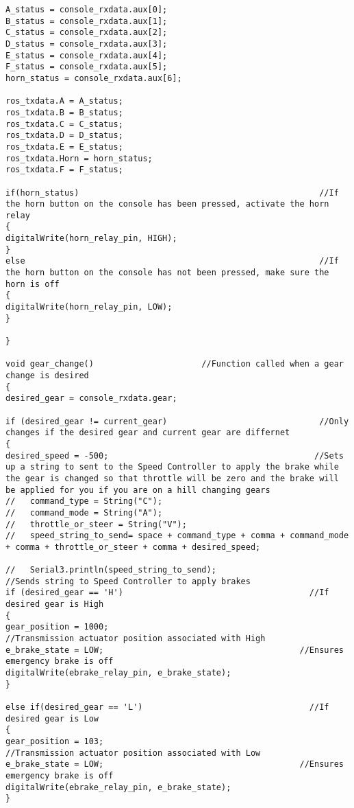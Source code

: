 \begin{lstlisting}[breaklines=true,basicstyle=\tiny]
A_status = console_rxdata.aux[0];
B_status = console_rxdata.aux[1];
C_status = console_rxdata.aux[2];
D_status = console_rxdata.aux[3];
E_status = console_rxdata.aux[4];
F_status = console_rxdata.aux[5];
horn_status = console_rxdata.aux[6];

ros_txdata.A = A_status;
ros_txdata.B = B_status;
ros_txdata.C = C_status;
ros_txdata.D = D_status;
ros_txdata.E = E_status;
ros_txdata.Horn = horn_status;
ros_txdata.F = F_status;

if(horn_status)                                                 //If the horn button on the console has been pressed, activate the horn relay
{
digitalWrite(horn_relay_pin, HIGH);                           
}
else                                                            //If the horn button on the console has not been pressed, make sure the horn is off
{
digitalWrite(horn_relay_pin, LOW);
}

}

void gear_change()                      //Function called when a gear change is desired
{
desired_gear = console_rxdata.gear;

if (desired_gear != current_gear)                               //Only changes if the desired gear and current gear are differnet
{
desired_speed = -500;                                          //Sets up a string to sent to the Speed Controller to apply the brake while the gear is changed so that throttle will be zero and the brake will be applied for you if you are on a hill changing gears
//   command_type = String("C");
//   command_mode = String("A");
//   throttle_or_steer = String("V");
//   speed_string_to_send= space + command_type + comma + command_mode + comma + throttle_or_steer + comma + desired_speed;

//   Serial3.println(speed_string_to_send);                         //Sends string to Speed Controller to apply brakes
if (desired_gear == 'H')                                      //If desired gear is High
{
gear_position = 1000;                                       //Transmission actuator position associated with High
e_brake_state = LOW;                                        //Ensures emergency brake is off
digitalWrite(ebrake_relay_pin, e_brake_state);              
}

else if(desired_gear == 'L')                                  //If desired gear is Low
{
gear_position = 103;                                        //Transmission actuator position associated with Low
e_brake_state = LOW;                                        //Ensures emergency brake is off
digitalWrite(ebrake_relay_pin, e_brake_state);
}


\end{lstlisting}
